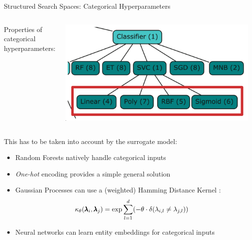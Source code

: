 \begin{frame}[c]{Structured Search Spaces: Categorical Hyperparameters}

\begin{columns}[T]

\medskip
Properties of categorical hyperparameters:


\vspace{0.5cm}
\includegraphics[width=1\textwidth]{images/categ_cond_params/categorical.png}
%
\end{columns}

\fhpause
\vspace*{-0.4cm}
This has to be taken into account by the surrogate model:
%
\begin{itemize}
    \item Random Forests \alert{natively} handle categorical inputs 
    \item \emph{One-hot} encoding provides a simple general solution
    \item Gaussian Processes can use a (weighted) \alert{Hamming Distance Kernel} :
\vspace*{-0.2cm}
\begin{equation*}
    \kappa_{\theta}(\pmb{\lambda}_i, \pmb{\lambda}_j) = \exp{\sum_{l=1}^d (-\theta \cdot \delta(\lambda_{i,l} \neq \lambda_{j,l}))}
\end{equation*}

\vspace*{-0.2cm}
\item Neural networks can learn \alert{entity embeddings} for categorical inputs 
\end{itemize}
%
\end{frame}
